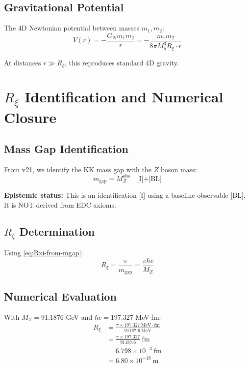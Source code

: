 \documentclass[11pt,a4paper]{article}
\newcommand{\Rxi}{R_\xi}
\newcommand{\Mfive}{M_5}
\newcommand{\GN}{G_N}
\newcommand{\MZ}{M_Z}
\newcommand{\mgap}{m_{\mathrm{gap}}}
\begin{document}
\subsection{Gravitational Potential}

The 4D Newtonian potential between masses $m_1, m_2$:
\begin{equation}
V(r) = -\frac{\GN m_1 m_2}{r} = -\frac{m_1 m_2}{8\pi \Mfive^3 \Rxi \cdot r}
\label{eq:Newton-potential}
\end{equation}

At distances $r \gg \Rxi$, this reproduces standard 4D gravity.

\section{$\Rxi$ Identification and Numerical Closure}

\subsection{Mass Gap Identification}

From v21, we identify the KK mass gap with the $Z$ boson mass:
\begin{equation}
\mgap = \MZ^{\mathrm{obs}} \quad \text{[I]+[BL]}
\label{eq:mgap-identification}
\end{equation}

\textbf{Epistemic status:} This is an identification [I] using a baseline observable [BL].
It is NOT derived from EDC axioms.

\subsection{$\Rxi$ Determination}

Using \eqref{eq:Rxi-from-mgap}:
\begin{equation}
\Rxi = \frac{\pi}{\mgap} = \frac{\pi \hbar c}{\MZ}
\label{eq:Rxi-from-MZ}
\end{equation}

\subsection{Numerical Evaluation}

With $\MZ = 91.1876$ GeV and $\hbar c = 197.327$ MeV$\cdot$fm:
\begin{align}
\Rxi &= \frac{\pi \times 197.327~\mathrm{MeV \cdot fm}}{91187.6~\mathrm{MeV}} \nonumber\\
&= \frac{\pi \times 197.327}{91187.6}~\mathrm{fm} \nonumber\\
&= 6.798 \times 10^{-3}~\mathrm{fm} \nonumber\\
&= 6.80 \times 10^{-18}~\mathrm{m}
\label{eq:Rxi-numerical}
\end{align}
\end{document}
